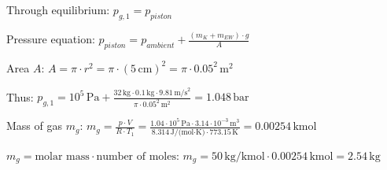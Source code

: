Through equilibrium:  
\( p_{g,1} = p_{piston} \)  

Pressure equation:  
\( p_{piston} = p_{ambient} + \frac{(m_K + m_{EW}) \cdot g}{A} \)  

Area \( A \):  
\( A = \pi \cdot r^2 = \pi \cdot (5 \, \text{cm})^2 = \pi \cdot 0.05^2 \, \text{m}^2 \)  

Thus:  
\( p_{g,1} = 10^5 \, \text{Pa} + \frac{32 \, \text{kg} \cdot 0.1 \, \text{kg} \cdot 9.81 \, \text{m/s}^2}{\pi \cdot 0.05^2 \, \text{m}^2} = 1.048 \, \text{bar} \)  

Mass of gas \( m_g \):  
\( m_g = \frac{p \cdot V}{R \cdot T_1} = \frac{1.04 \cdot 10^5 \, \text{Pa} \cdot 3.14 \cdot 10^{-3} \, \text{m}^3}{8.314 \, \text{J/(mol·K)} \cdot 773.15 \, \text{K}} = 0.00254 \, \text{kmol} \)  

\( m_g = \text{molar mass} \cdot \text{number of moles} \):  
\( m_g = 50 \, \text{kg/kmol} \cdot 0.00254 \, \text{kmol} = 2.54 \, \text{kg} \)